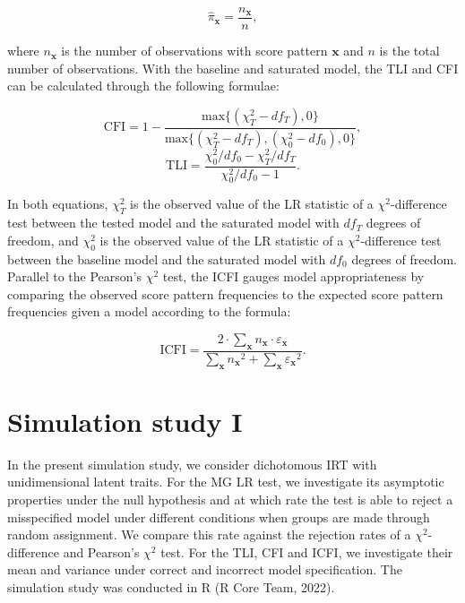 \documentclass[Royal,sageapa,times,doublespace]{sagej}
\begin{document}
\begin{equation*}
\hat{\pi}_{\boldsymbol{x}} = \frac{n_{\boldsymbol{x}}}{n},
\end{equation*}

where $n_{\boldsymbol{x}}$ is the number of observations with score pattern $\boldsymbol{x}$ and $n$ is the total number of observations. With the baseline and saturated model, the TLI and CFI can be calculated through the following formulae:

\begin{equation}
\text{CFI} = 1 - \frac{\text{max}\{(\chi^2_T - df_T), 0\}}{\text{max}\{(\chi^2_T - df_T), (\chi^2_0 - df_0), 0\}},
\end{equation}
\begin{equation}
\text{TLI} = \frac{\chi^2_0/df_0 - \chi^2_T/df_T}{\chi^2_0/df_0 - 1}.
\end{equation}

In both equations, $\chi^{2}_{T}$ is the observed value of the LR statistic of a $\chi^2$-difference test between the tested model and the saturated model with $df_T$ degrees of freedom, and $\chi^{2}_{0}$ is the observed value of the LR statistic of a $\chi^2$-difference test between the baseline model and the saturated model with $df_0$ degrees of freedom. \\
\indent Parallel to the Pearson's $\chi^2$ test, the ICFI gauges model appropriateness by comparing the observed score pattern frequencies to the expected score pattern frequencies given a model according to the formula:

\begin{equation}
\text{ICFI} = \frac{2 \cdot \sum_{\boldsymbol{x}}  n_{\boldsymbol{x}} \cdot \varepsilon_{\boldsymbol{x}}  }{  \sum_{\boldsymbol{x}}  {n_{\boldsymbol{x}}}^2 +  \sum_{\boldsymbol{x}}  {\varepsilon_{\boldsymbol{x}}} ^2 }.
\end{equation}

\section{\centering Simulation study I}

In the present simulation study, we consider dichotomous IRT with unidimensional latent traits. For the MG LR test, we investigate its asymptotic properties under the null hypothesis and at which rate the test is able to reject a misspecified model under different conditions when groups are made through random assignment. We compare this rate against the rejection rates of a $\chi^2$-difference and Pearson's $\chi^2$ test. For the TLI, CFI and ICFI, we investigate their mean and variance under correct and incorrect model specification. The simulation study was conducted in R (R Core Team, 2022).
\end{document}
